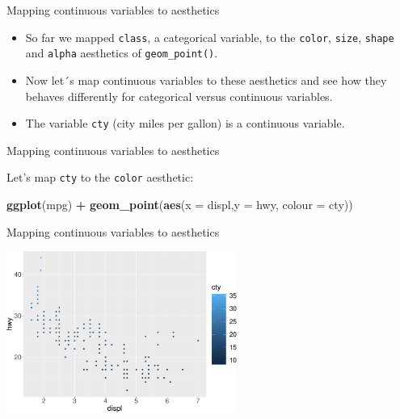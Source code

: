 \documentclass[ignorenonframetext,]{beamer}
\newenvironment{Shaded}{\begin{snugshade}}{\end{snugshade}}
\newcommand{\DataTypeTok}[1]{\textcolor[rgb]{0.13,0.29,0.53}{#1}}
\newcommand{\KeywordTok}[1]{\textcolor[rgb]{0.13,0.29,0.53}{\textbf{#1}}}
\newcommand{\NormalTok}[1]{#1}
\newcommand{\OperatorTok}[1]{\textcolor[rgb]{0.81,0.36,0.00}{\textbf{#1}}}
\newcommand{\StringTok}[1]{\textcolor[rgb]{0.31,0.60,0.02}{#1}}
\begin{document}
\begin{frame}[fragile]{Mapping continuous variables to aesthetics}
\protect\hypertarget{mapping-continuous-variables-to-aesthetics}{}

\begin{itemize}
\item
  So far we mapped \texttt{class}, a categorical variable, to the
  \texttt{color}, \texttt{size}, \texttt{shape} and \texttt{alpha}
  aesthetics of \texttt{geom\_point()}.
\item
  Now let´s map continuous variables to these aesthetics and see how
  they behaves differently for categorical versus continuous variables.
\item
  The variable \texttt{cty} (city miles per gallon) is a continuous
  variable.
\end{itemize}

\end{frame}

\begin{frame}[fragile]{Mapping continuous variables to aesthetics}
\protect\hypertarget{mapping-continuous-variables-to-aesthetics-1}{}

Let's map \texttt{cty} to the \texttt{color} aesthetic:

\begin{Shaded}
\begin{Highlighting}[]
\KeywordTok{ggplot}\NormalTok{(mpg) }\OperatorTok{+}
\StringTok{  }\KeywordTok{geom_point}\NormalTok{(}\KeywordTok{aes}\NormalTok{(}\DataTypeTok{x =}\NormalTok{ displ,}\DataTypeTok{y =}\NormalTok{ hwy, }\DataTypeTok{colour =}\NormalTok{ cty))}
\end{Highlighting}
\end{Shaded}

\end{frame}

\begin{frame}{Mapping continuous variables to aesthetics}
\protect\hypertarget{mapping-continuous-variables-to-aesthetics-2}{}

\begin{center}\includegraphics[height=200px]{data-visualization_files/figure-beamer/unnamed-chunk-22-1} \end{center}

\end{frame}
\end{document}
